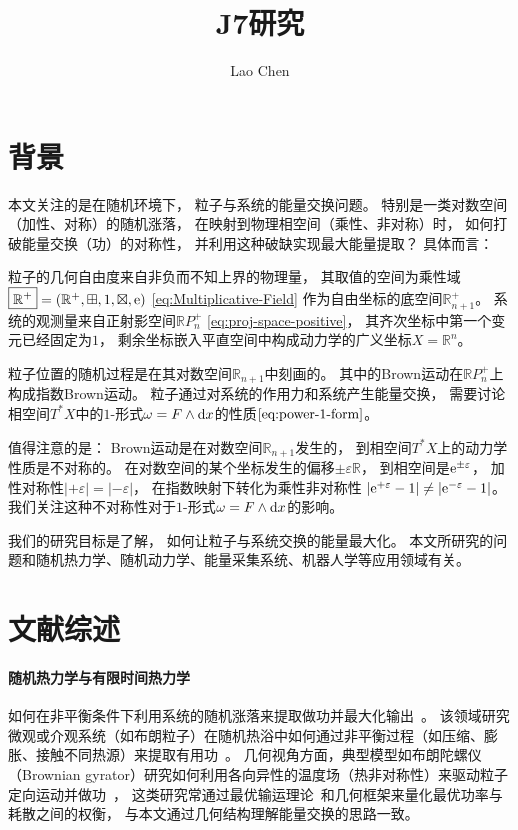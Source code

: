﻿\documentclass[10pt,a4paper]{article}
\newcommand{\sqplus}{\mathbin{\boxplus}}
\newcommand{\sqtimes}{\mathbin{\boxtimes}}
\begin{document}
\title{\textbf{J7研究}\\  }
\author{Lao Chen}
\maketitle
\setcounter{tocdepth}{1}
\tableofcontents 


\section{背景}

本文关注的是在随机环境下，
粒子与系统的能量交换问题。
特别是一类对数空间（加性、对称）的随机涨落，
在映射到物理相空间（乘性、非对称）时，
如何打破能量交换（功）的对称性，
并利用这种破缺实现最大能量提取？
具体而言：

粒子的几何自由度来自非负而不知上界的物理量，
其取值的空间为乘性域
$\boxed{\mathbb R^+} = (\mathbb R^+,\sqplus,1,\sqtimes,\text e)$
\eqref{eq:Multiplicative-Field}
作为自由坐标的底空间$\boxed{\mathbb R^+_{n+1}}$。
系统的观测量来自正射影空间$\mathbb R P^+_n$
\eqref{eq:proj-space-positive}，
其齐次坐标中第一个变元已经固定为$1$，
剩余坐标嵌入平直空间中构成动力学的广义坐标$X = \mathbb R^n$。

粒子位置的随机过程是在其对数空间$\mathbb R_{n+1}$中刻画的。
其中的Brown运动在$\mathbb R P^+_n$上构成指数Brown运动。
粒子通过对系统的作用力和系统产生能量交换，
需要讨论相空间$T^*X$中的$1$-形式$\omega = F \wedge \text dx$的性质$\eqref{eq:power-1-form}$。

值得注意的是：
Brown运动是在对数空间$\mathbb R_{n+1}$发生的，
到相空间$T^*X$上的动力学性质是不对称的。
在对数空间的某个坐标发生的偏移$\pm\varepsilon \mathbb R$，
到相空间是$\text e^{\pm\varepsilon}$，
加性对称性$|+\varepsilon| = |-\varepsilon|$，
在指数映射下转化为乘性非对称性
$|\text e^{+\varepsilon} - 1| \neq |\text e^{-\varepsilon} - 1|$。
我们关注这种不对称性对于$1$-形式$\omega = F \wedge \text dx$的影响。

我们的研究目标是了解，
如何让粒子与系统交换的能量最大化。
本文所研究的问题和随机热力学、随机动力学、能量采集系统、机器人学等应用领域有关。

\section{文献综述}
 
\paragraph{随机热力学与有限时间热力学}
如何在非平衡条件下利用系统的随机涨落来提取做功并最大化输出~\cite{Seifert2012Stochastic, Esposito2010Entropy}。
该领域研究微观或介观系统（如布朗粒子）在随机热浴中如何通过非平衡过程（如压缩、膨胀、接触不同热源）来提取有用功~\cite{Kramers1940Brownian, Jarzynski1997Nonequilibrium}。
几何视角方面，典型模型如布朗陀螺仪（Brownian gyrator）研究如何利用各向异性的温度场（热非对称性）来驱动粒子定向运动并做功~\cite{Filippetti2021Brownian, Sasa2014Stochastic}，
这类研究常通过最优输运理论~\cite{Villani2009Optimal}和几何框架来量化最优功率与耗散之间的权衡，
与本文通过几何结构理解能量交换的思路一致。
\end{document}
